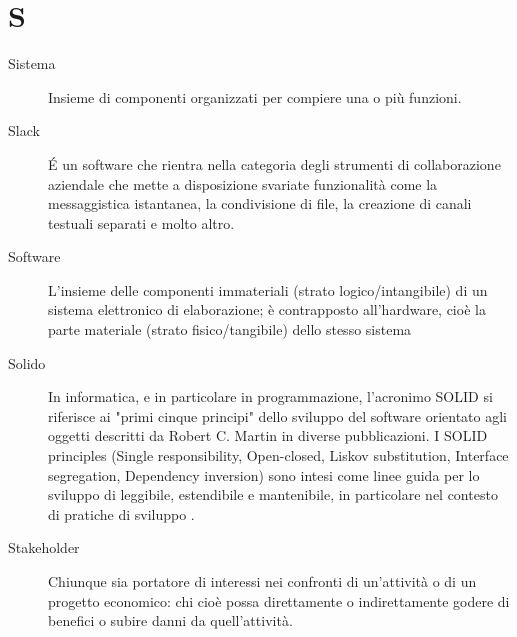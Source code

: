 \documentclass[a4paper, oneside]{article}
\begin{document}
\section{S}
\begin{description}
  \item[Sistema] Insieme di componenti organizzati per compiere una o più funzioni.
  \item[Slack] É un software che rientra nella categoria degli strumenti di collaborazione aziendale che mette a disposizione svariate funzionalità come la messaggistica istantanea, la condivisione di file, la creazione di canali testuali separati e molto altro.
  \item[Software] L'insieme delle componenti immateriali (strato logico/intangibile) di un sistema elettronico di elaborazione; è contrapposto all'hardware, cioè la parte materiale (strato fisico/tangibile) dello stesso sistema
  \item[Solido] In informatica, e in particolare in programmazione, l'acronimo SOLID si riferisce ai "primi cinque principi" dello sviluppo del software orientato agli oggetti descritti da Robert C. Martin in diverse pubblicazioni. I SOLID principles (Single responsibility, Open-closed, Liskov substitution, Interface segregation, Dependency inversion) sono intesi come linee guida per lo sviluppo di  leggibile, estendibile e mantenibile, in particolare nel contesto di pratiche di sviluppo .
  \item[Stakeholder] Chiunque sia portatore di interessi nei confronti di un’attività o di un progetto economico: chi cioè possa direttamente o indirettamente godere di benefici o subire danni da quell’attività.
\end{description}
\newpage
\end{document}
